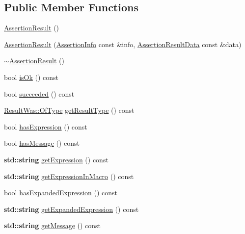 \subsection*{Public Member Functions}
\begin{DoxyCompactItemize}
\item 
\hyperlink{class_catch_1_1_assertion_result_a570b999c5f66e33cb31d3adb29fec25b}{Assertion\+Result} ()
\item 
\hyperlink{class_catch_1_1_assertion_result_ab58aeec27052ba400633ed0e36cea692}{Assertion\+Result} (\hyperlink{struct_catch_1_1_assertion_info}{Assertion\+Info} const \&info, \hyperlink{struct_catch_1_1_assertion_result_data}{Assertion\+Result\+Data} const \&data)
\item 
\hyperlink{class_catch_1_1_assertion_result_abf90f5abd04d38b2fb4f5d575bdc4f1e}{$\sim$\+Assertion\+Result} ()
\item 
bool \hyperlink{class_catch_1_1_assertion_result_ae39658b71c4afc3c8a859043b0e97027}{is\+Ok} () const
\item 
bool \hyperlink{class_catch_1_1_assertion_result_ac5cc872b721d5fb65d87221d30b22fdd}{succeeded} () const
\item 
\hyperlink{struct_catch_1_1_result_was_a624e1ee3661fcf6094ceef1f654601ef}{Result\+Was\+::\+Of\+Type} \hyperlink{class_catch_1_1_assertion_result_ac810750194e1722489d2fd16e8c6a4a8}{get\+Result\+Type} () const
\item 
bool \hyperlink{class_catch_1_1_assertion_result_aba37b4fef1015989df2136592958e984}{has\+Expression} () const
\item 
bool \hyperlink{class_catch_1_1_assertion_result_aae37064b401919fa8ac480ef86cca924}{has\+Message} () const
\item 
\textbf{ std\+::string} \hyperlink{class_catch_1_1_assertion_result_a26a777f3959353c729544cb2ace0d279}{get\+Expression} () const
\item 
\textbf{ std\+::string} \hyperlink{class_catch_1_1_assertion_result_aac35a0ca42d33bff6467c76573730f5e}{get\+Expression\+In\+Macro} () const
\item 
bool \hyperlink{class_catch_1_1_assertion_result_a78c43506c2b3d8cc1fb141a97d09ec94}{has\+Expanded\+Expression} () const
\item 
\textbf{ std\+::string} \hyperlink{class_catch_1_1_assertion_result_aaa46070791a6c07caaed86229b8d9d75}{get\+Expanded\+Expression} () const
\item 
\textbf{ std\+::string} \hyperlink{class_catch_1_1_assertion_result_ae730943beed46921b09383c673e35786}{get\+Message} () const

\end{DoxyCompactItemize}
